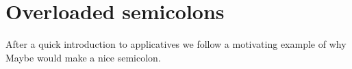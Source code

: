\section{Overloaded semicolons}
After a quick introduction to applicatives we follow a motivating example of
why Maybe would make a nice semicolon.

